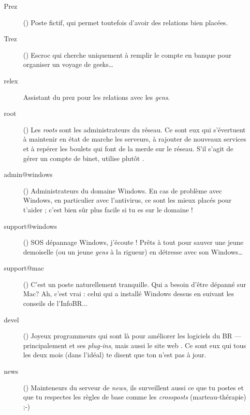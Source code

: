\begin{description}

  \item[Prez]{() Poste fictif, qui permet toutefois d'avoir
des relations bien plac\'ees.}

  \item[Trez]{() Escroc qui cherche uniquement \`a remplir le compte en banque pour organiser un voyage de geeks\dots}

  \item[relex]{Assistant du prez pour les relations avec les \emph{gens}.}

  \item[root]{() Les \emph{roots} sont les administrateurs du r\'eseau. Ce sont eux qui s'\'evertuent \`a maintenir en \'etat de marche les serveurs, \`a rajouter de nouveaux services et \`a rep\'erer les boulets qui font de la merde sur le r\'eseau. S'il s'agit de g\'erer un compte de binet, utilise plut\^ot .}

  \item[admin@windows] {() Administrateurs du domaine Windows. En cas de probl\`eme avec Windows, en particulier avec l'antivirus, ce sont les mieux plac\'es pour t'aider ; c'est bien s\^ur  plus facile si tu es sur le domaine !
}
  \item[support@windows] {() SOS d\'epannage Windows, j'\'ecoute ! Pr\^ets \`a tout pour sauver une jeune demoiselle (ou un jeune \emph{gens} \`a la rigueur) en d\'etresse avec son Windows\dots }

  \item[support@mac] {() C'est un poste naturellement tranquille. Qui a besoin d'\^etre d\'epann\'e sur Mac? Ah, c'est vrai : celui qui a install\'e Windows dessus en suivant les conseils de l'InfoBR... }

  \item[devel]{() Joyeux programmeurs qui sont l\`a pour am\'eliorer les logiciels du BR --- principalement  et ses \emph{plug-ins}, mais aussi le site web . Ce sont eux qui tous les deux mois (dans l'idéal) te disent que ton  n'est pas \`a jour.}

  \item[news] {() Mainteneurs du serveur de \emph{news}, ils surveillent aussi ce que tu postes et que tu respectes les r\`egles de base comme les \emph{crossposts} (marteau-th\'erapie) \mbox{;-)}}


\end{description}
